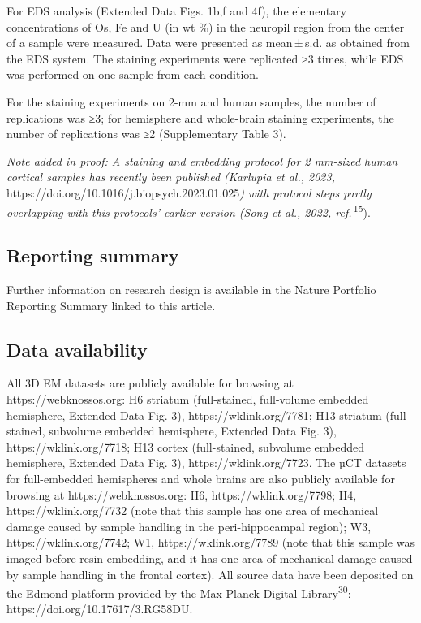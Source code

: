 \documentclass{article}
\begin{document}
For EDS analysis (Extended Data Figs. 1b,f and 4f), the elementary concentrations of Os, Fe and U (in wt \%) in the neuropil region from the center of a sample were measured. Data were presented as mean\,±\,s.d. as obtained from the EDS system. The staining experiments were replicated ≥3 times, while EDS was performed on one sample from each condition.

For the staining experiments on 2-mm and human samples, the number of replications was ≥3; for hemisphere and whole-brain staining experiments, the number of replications was ≥2 (Supplementary Table 3).

\emph{Note added in proof: A staining and embedding protocol for 2 mm-sized human cortical samples has recently been published (Karlupia et al., 2023,} https://doi.org/10.1016/j.biopsych.2023.01.025\emph{) with protocol steps partly overlapping with this protocols’ earlier version (Song et al., 2022, ref.}\,\textsuperscript{15}).

\subsection*{Reporting summary}
Further information on research design is available in the Nature Portfolio Reporting Summary linked to this article.

\subsection*{Data availability}
All 3D EM datasets are publicly available for browsing at https://webknossos.org: H6 striatum (full-stained, full-volume embedded hemisphere, Extended Data Fig. 3), https://wklink.org/7781; H13 striatum (full-stained, subvolume embedded hemisphere, Extended Data Fig. 3), https://wklink.org/7718; H13 cortex (full-stained, subvolume embedded hemisphere, Extended Data Fig. 3), https://wklink.org/7723. The µCT datasets for full-embedded hemispheres and whole brains are also publicly available for browsing at https://webknossos.org: H6, https://wklink.org/7798; H4, https://wklink.org/7732 (note that this sample has one area of mechanical damage caused by sample handling in the peri-hippocampal region); W3, https://wklink.org/7742; W1, https://wklink.org/7789 (note that this sample was imaged before resin embedding, and it has one area of mechanical damage caused by sample handling in the frontal cortex). All source data have been deposited on the Edmond platform provided by the Max Planck Digital Library\textsuperscript{30}: https://doi.org/10.17617/3.RG58DU.
\end{document}
